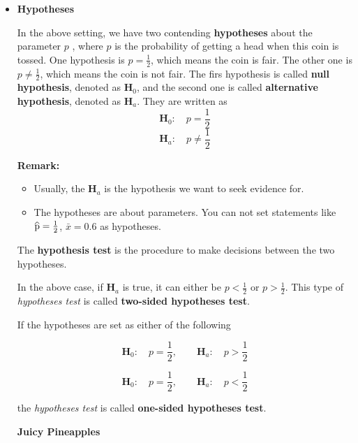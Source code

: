 \documentclass[a4paper, 12pt,twoside]{book}
\newcommand\reallywidehat[1]{%
\savestack{\tmpbox}{\stretchto{%
  \scaleto{%
    \scalerel*[\widthof{\ensuremath{#1}}]{\kern-.6pt\bigwedge\kern-.6pt}%
    {\rule[-\textheight/2]{1ex}{\textheight}}%
  }{\textheight}%
}{0.5ex}}%
\stackon[1pt]{#1}{\tmpbox}%
}
\begin{document}
\begin{itemize}
\item \textbf{Hypotheses}\vspace{0.3cm}

In the above setting, we have two contending \textbf{hypotheses} about the parameter $p$ , where $p$ is the probability of getting a head when this coin is tossed. One hypothesis is $\displaystyle{p=\frac{1}{2}}$, which means the coin is fair. The other one is $\displaystyle{p \ne \frac{1}{2}}$, which means the coin is not fair. The firs hypothesis is called \textbf{null hypothesis}, denoted as $\textbf{H}_0$, and the second one is called \textbf{alternative hypothesis}, denoted as $\textbf{H}_a$. They are written as 
$$\textbf{H}_0:\quad p=\frac{1}{2}$$
$$\textbf{H}_a:\quad p\ne\frac{1}{2}$$
\colorbox{babypink}{\parbox{0.9\textwidth}{
\textbf{Remark:}
\begin{itemize}
\item Usually, the $\textbf{H}_a$ is the hypothesis we want to seek evidence for.
 \item The hypotheses are about parameters. 
You can not set statements like $\reallywidehat{p} = \frac{1}{2}$, $\bar{x} = 0.6$ as hypotheses.
 \end{itemize}
}}
\vspace{0.3cm}

 The \textbf{hypothesis test} is the procedure to make decisions between the two hypotheses.\vspace{0.3cm}

In the above case, if $\textbf{H}_a$ is true, it can either be $p < \frac{1}{2}$ or $p > \frac{1}{2}$. This type of \textit{hypotheses test} is called \textbf{two-sided hypotheses test}.\vspace{0.3cm}

If the hypotheses are set as either of the following

$$\textbf{H}_0:\quad p=\frac{1}{2}, \qquad \textbf{H}_a:\quad p >\frac{1}{2}$$

$$\textbf{H}_0:\quad p=\frac{1}{2}, \qquad \textbf{H}_a:\quad p <\frac{1}{2}$$

the \textit{hypotheses test} is called \textbf{one-sided hypotheses test}.\vspace{0.6cm}

\colorbox{champagne}{\parbox{0.9\textwidth}{
\textbf{Juicy Pineapples}\vspace{0.3cm}

}}
\end{itemize}
\end{document}
